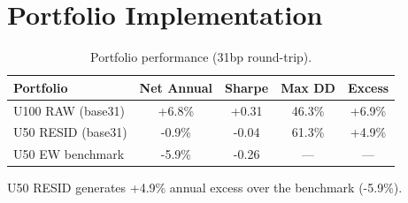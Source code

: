 \section{Portfolio Implementation}
\begin{table}[htbp]\centering
\caption{Portfolio performance (31bp round-trip).}\label{tab:portfolio}
\begin{tabular}{lcccc}
\toprule
\textbf{Portfolio} & \textbf{Net Annual} & \textbf{Sharpe} & \textbf{Max DD} & \textbf{Excess} \\
\midrule
U100 RAW (base31) & +6.8\% & +0.31 & 46.3\% & +6.9\% \\
U50 RESID (base31) & -0.9\% & -0.04 & 61.3\% & +4.9\% \\
U50 EW benchmark & -5.9\% & -0.26 & --- & --- \\
\bottomrule
\end{tabular}
\end{table}
U50 RESID generates +4.9\% annual excess over the benchmark (-5.9\%).
